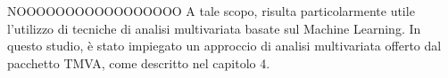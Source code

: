 NOOOOOOOOOOOOOOOOO%
A tale scopo, risulta particolarmente utile l’utilizzo di tecniche di analisi multivariata basate sul Machine Learning. In questo studio, è stato impiegato un approccio di analisi multivariata offerto dal pacchetto TMVA, come descritto nel capitolo 4.

\section{}